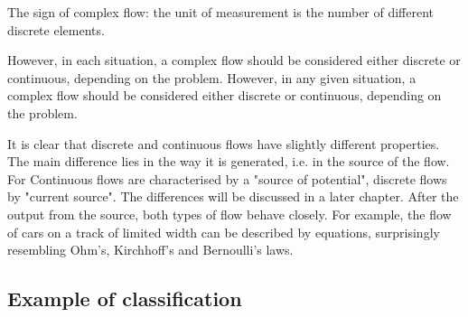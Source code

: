 \documentclass[a4paper,11pt]{article}
\begin{document}
The sign of complex flow: the unit of measurement is the number of different
discrete elements.

However, in each situation, a complex flow should be considered either
discrete or continuous, depending on the problem. However, in any given
situation, a complex flow should be considered either discrete or continuous,
depending on the problem.

It is clear that discrete and continuous flows have slightly different
properties.  The main difference lies in the way it is generated, i.e. in the
source of the flow. For Continuous flows are characterised by a "source of
potential", discrete flows by "current source". The differences will be
discussed in a later chapter. After the output from the source, both types of
flow behave closely. For example, the flow of cars on a track of limited width
can be described by equations, surprisingly resembling Ohm's, Kirchhoff's and
Bernoulli's laws.

\subsection{Example of classification}
\end{document}
